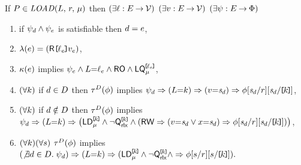 \noindent
If $\aPS \in \sLOAD[\amode]{\cExp}{\aReg}$ then
$(\exists\cVal:\aEvs\fun\Val)$
$(\exists\aVal:\aEvs\fun\Val)$
$(\exists\bForm:\aEvs\fun\Formulae)$
\begin{enumerate}
\item if $\bForm_\bEv\land\bForm_\aEv$ is satisfiable then $\bEv=\aEv$,
\item $\labelingAct(\aEv) = \DRREFP{\cVal_\aEv}{\aVal_\aEv}$,
\item $\labelingForm(\aEv)$ implies
  \begin{math}
    \bForm_\aEv
    \land \cExp{=}\cVal_\aEv
    \land \RO
    \land \QL{\REF{\cVal_\aEv}}{\amode}
  \end{math},
\item
  \begin{math}
    (\forall\dVal)
  \end{math}
  if $\bEv\in\bEvs$ then
  $\aTr[\bEvs](\aForm)$ implies
  \begin{math}
    \bForm_\bEv
    \limplies (\cExp{=}\dVal)
    \limplies (\aVal{=}\uReg{\bEv})
    \limplies \aForm[\uReg{\bEv}/\aReg][\uReg{\bEv}/\REF{\dVal}]
  \end{math},
  \makebox[4.8cm]{}
\item 
  \begin{math}
    (\forall\dVal)
  \end{math}
  if $\bEv\notin\bEvs$ then
  $\aTr[\bEvs](\aForm)$ implies
  \begin{math}
    \bForm_\bEv
    \limplies (\cExp{=}\dVal)
    \limplies \PBRbig{        
      \DL{\REF{\dVal}}{\amode}
      \land \lnot\QxREF{\dVal}
      \land
      (\RW
      \limplies (\aVal{=}\uReg{\bEv}\lor\aLoc{=}\uReg{\bEv}) 
      \limplies \aForm[\uReg{\bEv}/\aReg][\uReg{\bEv}/\REF{\dVal}]
      )
    }      
  \end{math},
\item %
  \begin{math}
    (\forall\dVal)
    (\forall\bReg)
  \end{math}
  $\aTr[\bEvs](\aForm)$ implies 
  \begin{math}
    (\not\exists\bEv\in\bEvs.\; \bForm_\bEv)
    \limplies (\cExp{=}\dVal)
    \limplies \PBR{        
      \DL{\REF{\dVal}}{\amode}
      \land \lnot\QxREF{\dVal}
      \land
      \limplies \aForm[\bReg/\aReg][\bReg/\REF{\dVal}]
    }.
  \end{math}
\end{enumerate}  
